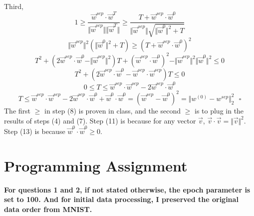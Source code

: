\documentclass[paper=letter, fontsize=12pt]{article}
\begin{document}
\begin{enumerate}
Third,
\begin{equation}
1 \geq \frac{\vec{w}^{sep} \cdot \vec{w}^T}{\Vert \vec{w}^{sep} \Vert \Vert \vec{w}^{T} \Vert} \geq \frac{T + \vec{w}^{sep} \cdot \vec{w}^{0}}{\Vert \vec{w}^{sep} \Vert  \sqrt{\Vert \vec{w}^{0} \Vert^2 + T}}
\end{equation}
\begin{equation}
\Vert \vec{w}^{sep} \Vert^2 (\Vert \vec{w}^{0} \Vert^2 + T) \geq {(T + \vec{w}^{sep} \cdot \vec{w}^{0})}^2
\end{equation}
\begin{equation}
T^2 + (2 \vec{w}^{sep} \cdot \vec{w}^{0} - \Vert \vec{w}^{sep} \Vert^2)T + {(\vec{w}^{sep} \cdot \vec{w}^{0})}^2 - \Vert \vec{w}^{sep} \Vert^2 \Vert \vec{w}^{0} \Vert^2 \leq 0
\end{equation}
\begin{equation}
T^2 + (2 \vec{w}^{sep} \cdot \vec{w}^{0} - \vec{w}^{sep} \cdot \vec{w}^{sep})T \leq 0
\end{equation}
\begin{equation}
0 \leq T \leq \vec{w}^{sep} \cdot \vec{w}^{sep} - 2 \vec{w}^{sep} \cdot \vec{w}^{0}
\end{equation}
\begin{equation}
T \leq \vec{w}^{sep} \cdot \vec{w}^{sep} - 2 \vec{w}^{sep} \cdot \vec{w}^{0} + \vec{w}^0 \cdot \vec{w}^0 = (\vec{w}^{sep} - \vec{w}^0)^2 = \Vert w^{(0)} - w^{sep} \Vert^2_2 \ \ \ \square
\end{equation}
The first $\geq$ in step (8) is proven in class, and the second $\geq$ is to plug in the results of steps (4) and (7). Step (11) is because for any vector $\vec{v}$, $\vec{v} \cdot \vec{v} = \Vert \vec{v} \Vert^2$. Step (13) is because $\vec{w}^0 \cdot \vec{w}^0 \geq 0$.
\end{enumerate}

\section{Programming Assignment}

\textbf{For questions 1 and 2, if not stated otherwise, the epoch parameter is set to 100. And for initial data processing, I preserved the original data order from MNIST.}
\end{document}

